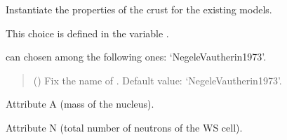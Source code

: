 \documentclass[letterpaper,10pt,english]{sphinxmanual}
\begin{document}
\begin{fulllineitems}
\label{\detokenize{source/api/setup_crust:nucleardatapy.setup_crust.SetupCrust}}
\pysigstartsignatures
\pysiglinewithargsret
{}
{}
{}
\pysigstopsignatures
\sphinxAtStartPar
Instantiate the properties of the crust for the existing models.

\sphinxAtStartPar
This choice is defined in the variable .

\sphinxAtStartPar
{} can chosen among the following ones: ‘Negele\sphinxhyphen{}Vautherin\sphinxhyphen{}1973’.
\begin{quote}\begin{description}
\sphinxAtStartPar
{} (\sphinxstyleliteralemphasis{\sphinxupquote{, }}) \textendash{} Fix the name of . Default value: ‘Negele\sphinxhyphen{}Vautherin\sphinxhyphen{}1973’.

\end{description}\end{quote}

\sphinxAtStartPar
{}

\begin{fulllineitems}
\label{\detokenize{source/api/setup_crust:nucleardatapy.setup_crust.SetupCrust.A}}
\pysigstartsignatures
\pysigline
{}
\pysigstopsignatures
\sphinxAtStartPar
Attribute A (mass of the nucleus).

\end{fulllineitems}


\begin{fulllineitems}
\label{\detokenize{source/api/setup_crust:nucleardatapy.setup_crust.SetupCrust.N}}
\pysigstartsignatures
\pysigline
{}
\pysigstopsignatures
\sphinxAtStartPar
Attribute N (total number of neutrons of the WS cell).


\end{fulllineitems}
\end{fulllineitems}
\end{document}
